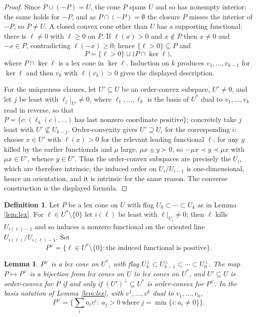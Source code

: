 \documentclass[11pt]{amsart}
\theoremstyle{plain}
\newtheorem{lemma}[theorem]{Lemma}
\theoremstyle{definition}
\newtheorem{definition}[theorem]{Definition}
\begin{document}
\begin{proof}
Since $P\cup(-P)=U$, the cone $P$ spans $U$ and so has nonempty interior; the same holds for $-P$, and as $P\cap(-P)=\emptyset$ the closure $\overline{P}$ misses the interior of $-P$, so $\overline{P}\neq U$. A closed convex cone other than $U$ has a supporting functional: there is $\ell\neq0$ with $\ell\ge0$ on $P$. If $\ell(x)>0$ and $x\notin P$ then $x\neq0$ and $-x\in P$, contradicting $\ell(-x)\ge0$; hence $\{\ell>0\}\subseteq P$ and
\[
P=\{\ell>0\}\sqcup\big(P\cap\ker\ell\big),
\]
where $P\cap\ker\ell$ is a lex cone in $\ker\ell$. Induction on $k$ produces $v_1,\dots,v_{k-1}$ for $\ker\ell$ and then $v_k$ with $\ell(v_k)>0$ gives the displayed description.

For the uniqueness clauses, let $U'\subseteq U$ be an order-convex subspace, $U'\neq0$, and let $j$ be least with $\ell_j|_{U'}\neq0$, where $\ell_1,\dots,\ell_k$ is the basis of $U^{*}$ dual to $v_1,\dots,v_k$ read in reverse, so that $P=\{c:(\ell_k(c),\dots)\ \text{has last nonzero coordinate positive}\}$; concretely take $j$ least with $U'\not\subseteq U_{k-j}$. Order-convexity gives $U'\supseteq U_i$ for the corresponding $i$: choose $x\in U'$ with $\ell(x)>0$ for the relevant leading functional $\ell$; for any $y$ killed by the earlier functionals and $\mu$ large, $\mu x\pm y\succ0$, so $-\mu x\prec y\prec\mu x$ with $\mu x\in U'$, whence $y\in U'$. Thus the order-convex subspaces are precisely the $U_i$, which are therefore intrinsic; the induced order on $U_i/U_{i-1}$ is one-dimensional, hence an orientation, and it is intrinsic for the same reason. The converse construction is the displayed formula.
\end{proof}

\begin{definition}\label{def:dual}
Let $P$ be a lex cone on $U$ with flag $U_0\subset\cdots\subset U_k$ as in Lemma \ref{lem:lex}. For $\ell\in U^{*}\setminus\{0\}$ let $i(\ell)$ be least with $\ell|_{U_{i}}\neq0$; then $\ell$ kills $U_{i(\ell)-1}$ and so induces a nonzero functional on the oriented line $U_{i(\ell)}/U_{i(\ell)-1}$. Set
\[
P^{\vee}=\{\ell\in U^{*}\setminus\{0\}:\text{the induced functional is positive}\}.
\]
\end{definition}

\begin{lemma}\label{lem:dualcone}
$P^{\vee}$ is a lex cone on $U^{*}$, with flag $U_k^{\perp}\subset U_{k-1}^{\perp}\subset\cdots\subset U_0^{\perp}$. The map $P\mapsto P^{\vee}$ is a bijection from lex cones on $U$ to lex cones on $U^{*}$, and $U'\subseteq U$ is order-convex for $P$ if and only if $(U')^{\perp}\subseteq U^{*}$ is order-convex for $P^{\vee}$. In the basis notation of Lemma \ref{lem:lex}, with $v^{1},\dots,v^{k}$ dual to $v_1,\dots,v_k$,
\[
P^{\vee}=\Big\{\textstyle\sum_i a_iv^{i}:\ a_j>0\ \text{where}\ j=\min\{i:a_i\neq0\}\Big\}.
\]
\end{lemma}
\end{document}
